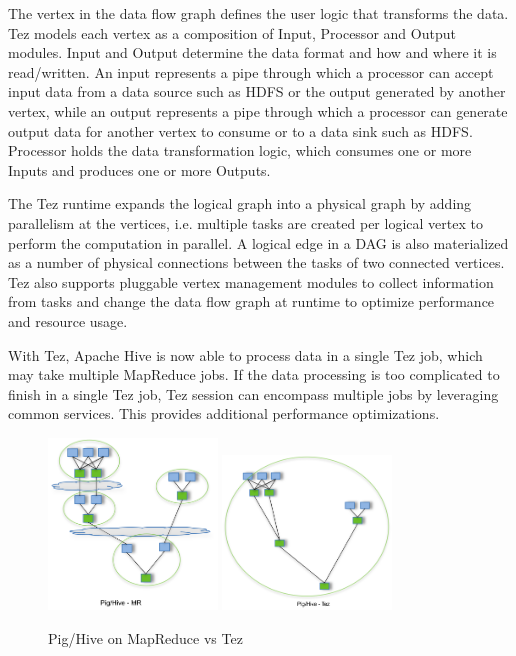 \documentclass[11pt]{book}
\begin{document}
The vertex in the data flow graph defines the user logic that transforms the data. Tez models each vertex as a composition of Input, Processor and Output modules. Input and Output determine the data format and how and where it is read/written. An input represents a pipe through which a processor can accept input data from a data source such as HDFS or the output generated by another vertex, while an output represents a pipe through which a processor can generate output data for another vertex to consume or to a data sink such as HDFS. Processor holds the data transformation logic, which consumes one or more Inputs and produces one or more Outputs.

The Tez runtime expands the logical graph into a physical graph by adding parallelism at the vertices, i.e. multiple tasks are created per logical vertex to perform the computation in parallel. A logical edge in a DAG is also materialized as a number of physical connections between the tasks of two connected vertices. Tez also supports pluggable vertex management modules to collect information from tasks and change the data flow graph at runtime to optimize performance and resource usage.

With Tez, Apache Hive is now able to process data in a single Tez job, which may take multiple MapReduce jobs. If the data processing is too complicated to finish in a single Tez job, Tez session can encompass multiple jobs by leveraging common services. This provides additional performance optimizations.
\begin{figure}[t]
\includegraphics[width=0.4\textwidth]{images/PigHive_MR.png}
\includegraphics[width=0.4\textwidth]{images/PigHive_Tez.png}
\centering
\caption{Pig/Hive on MapReduce vs Tez}
\end{figure}
\end{document}

